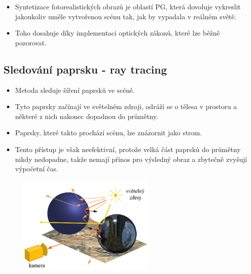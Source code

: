 \begin{itemize}
\item Syntetizace fotorealistických obrazů je oblastí PG, která dovoluje vykreslit jakoukoliv uměle vytvořenou scénu tak, jak by vypadala v reálném světě. 
\item Toho dosahuje díky implementaci optických zákonů, které lze běžně pozorovat.
\end{itemize}

\subsection{Sledování paprsku - ray tracing}
\begin{itemize}
 \item Metoda sleduje šíření paprsků ve scéně.
 \item Tyto paprsky začínají ve světelném zdroji, odráží se o tělesa v prostoru a některé z nich nakonec dopadnou do průmětny.
 \item Paprsky, které takto prochází scénu, lze znázornit jako strom.
 \item Tento přístup je však neefektivní, protože velká část paprsků do průmětny nikdy nedopadne, takže nemají přínos pro výsledný obraz a zbytečně zvyšují výpočetní čas.
\end{itemize}
\begin{figure}[H]
\centering
\includegraphics[width=0.6\textwidth]{assets/6_ray_trace_svetlo}
\end{figure}

